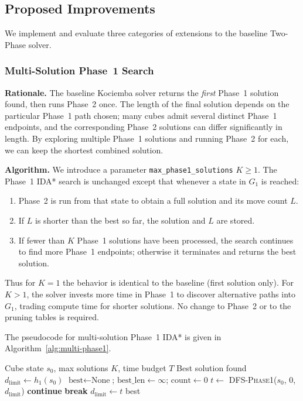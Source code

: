 \documentclass[10pt,twocolumn,a4paper]{article}
\begin{document}
\subsection{Proposed Improvements}
\label{sec:improvements}

We implement and evaluate three categories of extensions to the baseline Two-Phase solver.

\subsubsection{Multi-Solution Phase~1 Search}
\label{sec:multi-phase1}

\textbf{Rationale.} The baseline Kociemba solver returns the \emph{first} Phase~1 solution found, then runs Phase~2 once. The length of the final solution depends on the particular Phase~1 path chosen; many cubes admit several distinct Phase~1 endpoints, and the corresponding Phase~2 solutions can differ significantly in length. By exploring multiple Phase~1 solutions and running Phase~2 for each, we can keep the shortest combined solution.

\textbf{Algorithm.} We introduce a parameter \texttt{max\_phase1\_solutions} $K \geq 1$. The Phase~1 IDA* search is unchanged except that whenever a state in $G_1$ is reached:
\begin{enumerate}
  \item Phase~2 is run from that state to obtain a full solution and its move count $L$.
  \item If $L$ is shorter than the best so far, the solution and $L$ are stored.
  \item If fewer than $K$ Phase~1 solutions have been processed, the search continues to find more Phase~1 endpoints; otherwise it terminates and returns the best solution.
\end{enumerate}
Thus for $K=1$ the behavior is identical to the baseline (first solution only). For $K>1$, the solver invests more time in Phase~1 to discover alternative paths into $G_1$, trading compute time for shorter solutions. No change to Phase~2 or to the pruning tables is required.

The pseudocode for multi-solution Phase~1 IDA* is given in Algorithm~\ref{alg:multi-phase1}.

\begin{algorithm}[t]
\caption{Multi-Solution Phase~1 IDA*}
\label{alg:multi-phase1}
\begin{algorithmic}[1]
\REQUIRE Cube state $s_0$, max solutions $K$, time budget $T$
\ENSURE Best solution found
\STATE $d_{\text{limit}} \gets h_1(s_0)$
\STATE $\text{best} \gets \text{None}$; $\text{best\_len} \gets \infty$; $\text{count} \gets 0$
  \STATE $t \gets$ \textsc{DFS-Phase1}($s_0$, $0$, $d_{\text{limit}}$)
    \STATE \textbf{continue} 
  \ENDIF
    \STATE \textbf{break} 
  \ENDIF
  \STATE $d_{\text{limit}} \gets t$ 
\ENDWHILE
\RETURN best
\end{algorithmic}
\end{algorithm}
\end{document}
